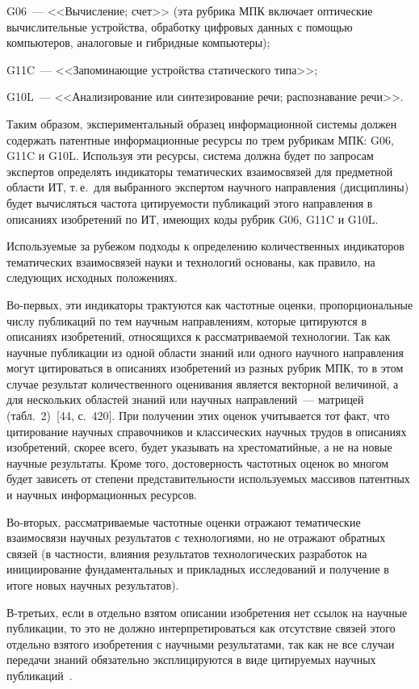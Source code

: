\begin{multicols}{2}
  G06~--- <<Вычисление; счет>> (эта рубрика МПК включает оптические вычислительные 
устройства, обработку цифровых данных с помощью компьютеров, аналоговые и гибридные 
компьютеры);
  
  G11C~--- <<Запоминающие устройства статического типа>>;
  
  G10L~--- <<Анализирование или синтезирование речи; распознавание речи>>.
  
  Таким образом, экспериментальный образец информационной системы должен содержать 
патентные информационные ресурсы по трем рубрикам МПК: G06, G11C и G10L. Используя 
эти ресурсы, сис\-те\-ма должна будет по запросам экспертов определять индикаторы 
тематических взаимосвязей для предметной области ИТ, т.\,е.\ для выбранного экспертом 
научного направления (дисциплины) будет вычисляться частота цитируемости публикаций 
этого направления в описаниях изобретений по ИТ, имеющих коды рубрик G06, G11C и G10L.
  
  Используемые за рубежом подходы к определению количественных индикаторов 
тематических взаимосвязей науки и технологий основаны, как правило, на следующих 
исходных положениях.
  
  Во-первых, эти индикаторы трактуются как час\-тот\-ные оценки, пропорциональные числу 
публикаций по тем научным направлениям, которые цитируются в описаниях изобретений, 
относящихся к рассматриваемой технологии. Так как научные публикации из одной области 
знаний или одного научного направления могут цитироваться в описаниях изобретений из 
разных рубрик МПК, то в этом случае результат количественного оценивания является 
векторной величиной, а для нескольких областей знаний или научных направлений~--- 
  мат\-ри\-цей (табл.~2)~[44, с.~420]. При получении этих оценок учитывается тот факт, 
что цитирование научных справочников и классических научных трудов в описаниях 
изобретений, скорее всего, будет указывать на хрестоматийные, а не на новые научные 
результаты. Кроме того, достоверность частотных оценок во многом будет зависеть от степени 
представительности используемых массивов патентных и научных информационных ресурсов.
  
  Во-вторых, рассматриваемые частотные оценки отражают тематические взаимосвязи 
научных результатов с технологиями, но не отражают обратных связей (в част\-ности, влияния 
результатов технологических разработок на инициирование фундаментальных и прикладных 
исследований и получение в итоге новых научных результатов).
  
  В-третьих, если в отдельно взятом описании изобретения нет ссылок на научные 
публикации, то это не должно интерпретироваться как отсутствие связей этого отдельно 
взятого изобретения с научными результатами, так как не все случаи передачи знаний 
обязательно эксплицируются в виде цитируемых научных публикаций~\cite{45-zat}.
  

\end{multicols}
